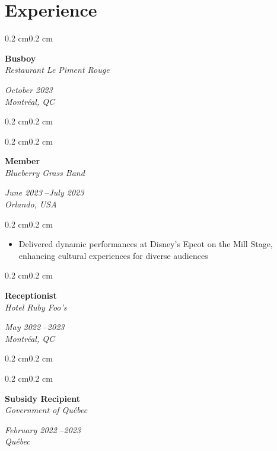 \documentclass[10pt, letterpaper]{article}
\newenvironment{highlights}{%
    \begin{itemize}[
        topsep=0.10 cm,%
        parsep=0.10 cm,%
        partopsep=0pt,%
        itemsep=0pt,%
        leftmargin=0.4 cm + 10pt%
    ]
}{%
    \end{itemize}%
}
\newenvironment{onecolentry}{%
    \begin{adjustwidth}{0.2 cm}{0.2 cm}%
}{%
    \end{adjustwidth}%
}
\newenvironment{twocolentry}[1]{%
    \begin{onecolentry}%
    \def\twocolentryarg{#1}%
    \noindent
    \begin{minipage}[t]{0.68\textwidth} %
}{%
    \end{minipage}\hfill%
    \begin{minipage}[t]{0.30\textwidth} %
      \raggedleft\twocolentryarg
    \end{minipage}%
    \vspace{0.2cm}%
    \end{onecolentry}%
}
\begin{document}
\section{Experience}
\begin{twocolentry}{%
\textit{October 2023 }\textit{} \\[0.1cm]
\textit{Montréal, QC}%
}
    \textbf{Busboy }\\
    \textit{Restaurant Le Piment Rouge }
\end{twocolentry}
\vspace{0.10 cm}
\begin{onecolentry}
    \begin{highlights}
    \end{highlights}
\end{onecolentry}
\vspace{0.2 cm}
\begin{twocolentry}{%
\textit{June 2023 }--\textit{July 2023} \\[0.1cm]
\textit{Orlando, USA}%
}
    \textbf{Member }\\
    \textit{Blueberry Grass Band }
\end{twocolentry}
\vspace{0.10 cm}
\begin{onecolentry}
    \begin{highlights}
        \item Delivered dynamic performances at Disney's Epcot on the Mill Stage, enhancing cultural experiences for diverse audiences
    \end{highlights}
\end{onecolentry}
\vspace{0.2 cm}
\begin{twocolentry}{%
\textit{May 2022 }--\textit{2023} \\[0.1cm]
\textit{Montréal, QC}%
}
    \textbf{Receptionist }\\
    \textit{Hotel Ruby Foo’s }
\end{twocolentry}
\vspace{0.10 cm}
\begin{onecolentry}
    \begin{highlights}
    \end{highlights}
\end{onecolentry}
\vspace{0.2 cm}
\begin{twocolentry}{%
\textit{February 2022 }--\textit{2023} \\[0.1cm]
\textit{Québec}%
}
    \textbf{Subsidy Recipient }\\
    \textit{Government of Québec }
\end{twocolentry}
\end{document}
